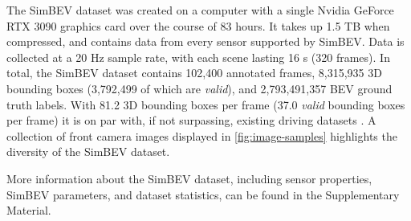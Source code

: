 The SimBEV dataset was created on a computer with a single Nvidia GeForce RTX 3090 graphics card over the course of 83 hours. It takes up 1.5 TB when compressed, and contains data from every sensor supported by SimBEV. Data is collected at a 20 Hz sample rate, with each scene lasting 16 s (320 frames). In total, the SimBEV dataset contains 102,400 annotated frames, 8,315,935 3D bounding boxes (3,792,499 of which are \textit{valid}), and 2,793,491,357 BEV ground truth labels. With 81.2 3D bounding boxes per frame (37.0 \textit{valid} bounding boxes per frame) it is on par with, if not surpassing, existing driving datasets \cite{caesar2020nuscenes, chang2019argoverse, wilson2023argoverse, weng2023all, sun2020scalability}. A collection of front camera images displayed in \cref{fig:image-samples} highlights the diversity of the SimBEV dataset.

More information about the SimBEV dataset, including sensor properties, SimBEV parameters, and dataset statistics, can be found in the Supplementary Material.